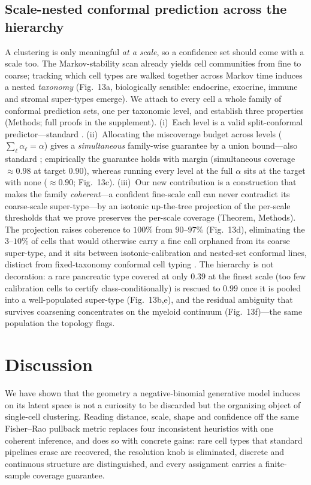 \documentclass[11pt]{article}
\newcommand{\snsimcorr}{0.98}   %
\newcommand{\snsimunc}{0.90}    %
\newcommand{\snrarefine}{0.39}  %
\newcommand{\snrarecoarse}{0.99}%
\begin{document}
\subsection{Scale-nested conformal prediction across the hierarchy}
A clustering is only meaningful \emph{at a scale}, so a confidence set should come with a scale too.
The Markov-stability scan already yields cell communities from fine to coarse; tracking which cell
types are walked together across Markov time induces a nested \emph{taxonomy} (Fig.~13a, biologically
sensible: endocrine, exocrine, immune and stromal super-types emerge). We attach to every cell a whole
family of conformal prediction sets, one per taxonomic level, and establish three properties (Methods;
full proofs in the supplement). (i)~Each level is a valid split-conformal predictor---standard
\citep{vovk2005algorithmic,sadinle2019least}. (ii)~Allocating the miscoverage budget across levels
($\sum_\ell\alpha_\ell=\alpha$) gives a \emph{simultaneous} family-wise guarantee by a union
bound---also standard \citep{baheri2025multiscale}; empirically the guarantee holds with margin
(simultaneous coverage $\approx\snsimcorr$ at target $0.90$), whereas running every level at the full
$\alpha$ sits at the target with none ($\approx\snsimunc$; Fig.~13c). (iii)~Our new contribution is a
construction that makes the family \emph{coherent}---a confident fine-scale call can never contradict
its coarse-scale super-type---by an isotonic up-the-tree projection of the per-scale thresholds that
we prove preserves the per-scale coverage (Theorem, Methods). The projection raises coherence to
$100\%$ from $90$--$97\%$ (Fig.~13d), eliminating the $3$--$10\%$ of cells that would otherwise carry a
fine call orphaned from its coarse super-type, and it sits between isotonic-calibration
\citep{vanderlaan2024selfcalibrating} and nested-set \citep{gupta2022nested} conformal lines, distinct
from fixed-taxonomy conformal cell typing \citep{corbetta2024conformal,lopezdecastro2025conformal,ding2023classcond}.
The hierarchy is not decoration: a rare pancreatic type covered at only $\snrarefine$ at the finest
scale (too few calibration cells to certify class-conditionally) is rescued to $\snrarecoarse$ once it
is pooled into a well-populated super-type (Fig.~13b,e), and the residual ambiguity that survives
coarsening concentrates on the myeloid continuum (Fig.~13f)---the same population the topology flags.

\section{Discussion}
We have shown that the geometry a negative-binomial generative model induces on its latent space is
not a curiosity to be discarded but the organizing object of single-cell clustering. Reading distance,
scale, shape and confidence off the same Fisher--Rao pullback metric replaces four inconsistent
heuristics with one coherent inference, and does so with concrete gains: rare cell types that standard
pipelines erase are recovered, the resolution knob is eliminated, discrete and continuous structure are
distinguished, and every assignment carries a finite-sample coverage guarantee.
\end{document}
